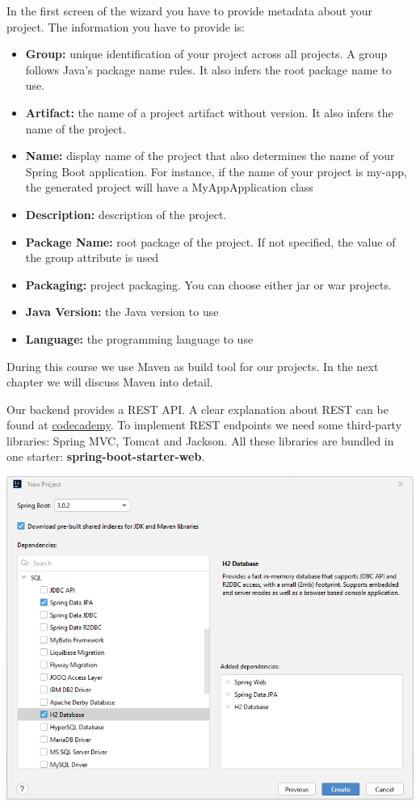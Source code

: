 \documentclass[a4paper, 12pt]{report}
\begin{document}
In the first screen of the wizard you have to provide metadata about your project.  The information you have to provide is:
\begin{itemize}
\item \textbf{Group:} unique identification of your project across all projects.  A group follows Java's package name rules. It also infers the root package name to use.
\item \textbf{Artifact:} the name of a project artifact without version.  It also infers the name of the project.
\item \textbf{Name:} display name of the project that also determines the name of your Spring Boot application. For instance,  if the name of your project is my-app, the generated project will have a MyAppApplication class
\item \textbf{Description:} description of the project.
\item \textbf{Package Name:} root package of the project. If not specified, the value of the group attribute is used
\item \textbf{Packaging:} project packaging.  You can choose either jar or war projects.
\item \textbf{Java Version:} the Java version to use
\item \textbf{Language:} the programming language to use
\end{itemize}

During this course we use Maven as build tool for our projects. In the next chapter we will discuss Maven into detail.

Our backend provides a REST API. A clear explanation about REST can be found at \href{https://www.codecademy.com/article/what-is-rest.}{codecademy}.  To implement REST endpoints we need some third-party libraries: Spring MVC, Tomcat and Jackson. All these libraries are bundled in one starter: \textbf{spring-boot-starter-web}.

\includegraphics[width=\textwidth]{./images/chapter2/new_project_metadata.png}
\end{document}
